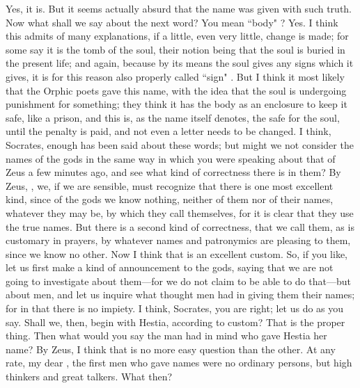 \socratesspeaks
Yes, it is. But it seems actually absurd that the name was given with such truth.
\hermogenesspeaks
Now what shall we say about the next word?
\socratesspeaks
You mean ``body" ?
\hermogenesspeaks
Yes.
\socratesspeaks
I think this admits of many explanations, if a little, even very little, change is made; for some say it is the tomb  of the soul,  their notion being that the soul is buried in the present life; and again, because by its means the soul gives any signs which it gives, it is for this reason also properly called ``sign" . But I think it most likely that the Orphic poets gave this name, with the idea that the soul is undergoing punishment for something; they think it has the body as an enclosure to keep it safe, like a prison, and this is, as the name itself denotes, the safe  for the soul, until the penalty is paid, and not even a letter needs to be changed. 
\hermogenesspeaks
I think, Socrates, enough has been said about these words; but might we not consider the names of the gods in the same way in which you were speaking about that of Zeus a few minutes ago, and see what kind of correctness there is in them?
\socratesspeaks
By Zeus, \hermogenesspeaks, we, if we are sensible, must recognize that there is one most excellent kind, since of the gods we know nothing, neither of them nor of their names, whatever they may be, by which they call themselves, for it is clear that they use the true names. But there is a second kind of correctness,  that we call them, as is customary in prayers, by whatever names and patronymics are pleasing to them, since we know no other.  Now I think that is an excellent custom. So, if you like, let us first make a kind of announcement to the gods, saying that we are not going to investigate about them—for we do not claim to be able to do that—but about men, and let us inquire what thought men had in giving them their names; for in that there is no impiety.
\hermogenesspeaks
I think, Socrates, you are right; let us do as you say. 
\socratesspeaks
Shall we, then, begin with Hestia, according to custom?
\hermogenesspeaks
That is the proper thing.
\socratesspeaks
Then what would you say the man had in mind who gave Hestia her name?
\hermogenesspeaks
By Zeus, I think that is no more easy question than the other.
\socratesspeaks
At any rate, my dear \hermogenesspeaks, the first men who gave names were no ordinary persons, but high thinkers and great talkers.
\hermogenesspeaks
What then?
